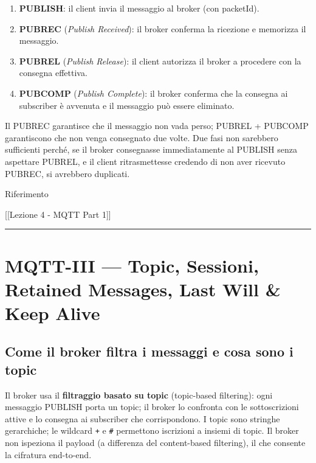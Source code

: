 \documentclass[
  italian,
  openany]{book}
\providecommand{\tightlist}{%
  \setlength{\itemsep}{0pt}\setlength{\parskip}{0pt}}
\begin{document}
\begin{enumerate}
\def\labelenumi{\arabic{enumi}.}
\tightlist
\item
  \textbf{PUBLISH}: il client invia il messaggio al broker (con
  packetId).
\item
  \textbf{PUBREC} (\emph{Publish Received}): il broker conferma la
  ricezione e memorizza il messaggio.
\item
  \textbf{PUBREL} (\emph{Publish Release}): il client autorizza il
  broker a procedere con la consegna effettiva.
\item
  \textbf{PUBCOMP} (\emph{Publish Complete}): il broker conferma che la
  consegna ai subscriber è avvenuta e il messaggio può essere eliminato.
\end{enumerate}

Il PUBREC garantisce che il messaggio non vada perso; PUBREL + PUBCOMP
garantiscono che non venga consegnato due volte. Due fasi non sarebbero
sufficienti perché, se il broker consegnasse immediatamente al PUBLISH
senza aspettare PUBREL, e il client ritrasmettesse credendo di non aver
ricevuto PUBREC, si avrebbero duplicati.

\begin{calloutnote}{Riferimento}

{[}{[}Lezione 4 - MQTT Part 1{]}{]}

\end{calloutnote}

\begin{center}\rule{0.5\linewidth}{0.5pt}\end{center}

\section{MQTT-III --- Topic, Sessioni, Retained Messages, Last Will \&
Keep
Alive}\label{mqtt-iii-topic-sessioni-retained-messages-last-will-keep-alive}

\subsection{Come il broker filtra i messaggi e cosa sono i
topic}\label{come-il-broker-filtra-i-messaggi-e-cosa-sono-i-topic}

Il broker usa il \textbf{filtraggio basato su topic} (topic-based
filtering): ogni messaggio PUBLISH porta un topic; il broker lo
confronta con le sottoscrizioni attive e lo consegna ai subscriber che
corrispondono. I topic sono stringhe gerarchiche; le wildcard \texttt{+}
e \texttt{\#} permettono iscrizioni a insiemi di topic. Il broker non
ispeziona il payload (a differenza del content-based filtering), il che
consente la cifratura end-to-end.
\end{document}
